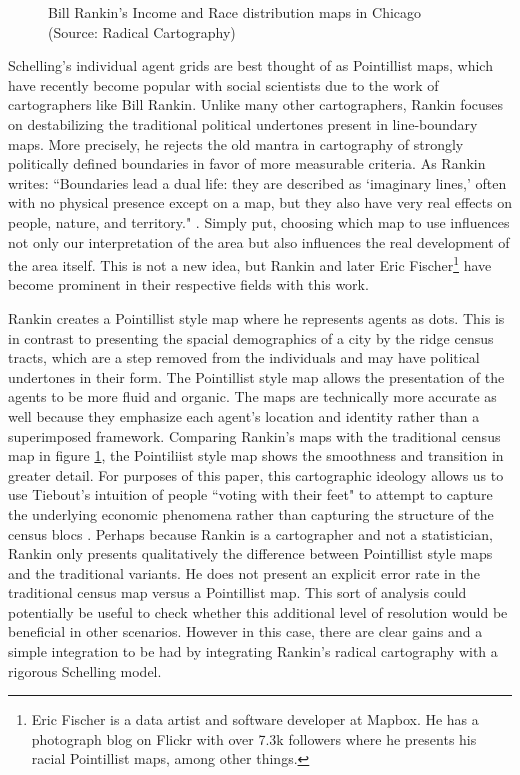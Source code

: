 \documentclass[11pt]{asaproc}
\newcommand{\1}{\mathbb{1}}
\begin{document}
\begin{figure}[!h]
\caption[Bill Rankin's Income and Race Maps of Chicago]{Bill Rankin's Income and Race distribution maps in Chicago (Source: Radical Cartography)}
\label{fig:rankin}
\end{figure}

Schelling's individual agent grids are best thought of as Pointillist maps, which have recently become popular with social scientists due to the work of cartographers like Bill Rankin. Unlike many other cartographers, Rankin focuses on destabilizing the traditional political undertones present in line-boundary maps. More precisely, he rejects the old mantra in cartography of strongly politically defined boundaries in favor of more measurable criteria. As Rankin writes: ``Boundaries lead a dual life: they are described as `imaginary lines,' often with no physical presence except on a map, but they also have very real effects on people, nature, and territory." \citep{rankin10}. Simply put, choosing which map to use influences not only our interpretation of the area but also influences the real development of the area itself. This is not a new idea, but Rankin and later Eric Fischer\footnote{Eric Fischer is a data artist and software developer at Mapbox. He has a photograph blog on Flickr with over 7.3k followers where he presents his racial Pointillist maps, among other things.} have become prominent in their respective fields with this work. 

Rankin creates a Pointillist style map where he represents agents as dots. This is in contrast to presenting the spacial demographics of a city by the ridge census tracts, which are a step removed from the individuals and may have political undertones in their form. The Pointillist style map allows the presentation of the agents to be more fluid and organic. The maps are technically more accurate as well because they emphasize each agent's location and identity rather than a superimposed framework. Comparing Rankin's maps with the traditional census map in figure \ref{fig:rankin}, the Pointiliist style map shows the smoothness and transition in greater detail. For purposes of this paper, this cartographic ideology allows us to use Tiebout's intuition of people ``voting with their feet" to attempt to capture the underlying economic phenomena rather than capturing the structure of the census blocs \citep{tiebout56}. Perhaps because Rankin is a cartographer and not a statistician, Rankin only presents qualitatively the difference between Pointillist style maps and the traditional variants\citep{rankin10}. He does not present an explicit error rate in the traditional census map versus a Pointillist map. This sort of analysis could potentially be useful to check whether this additional level of resolution would be beneficial in other scenarios. However in this case, there are clear gains and a simple integration to be had by integrating Rankin's radical cartography with a rigorous Schelling model.
\end{document}
